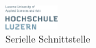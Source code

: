 \begin{figure}[ht]
    \centering
    \includegraphics[width=0.18\textwidth]{pic/logo.png}
    \caption{Serielle Schnittstelle}
    \label{fig:sub_sim_system}
\end{figure}

